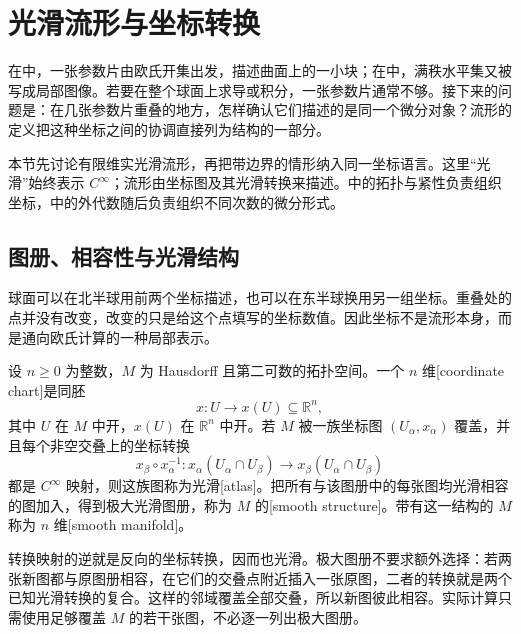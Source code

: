 \section{光滑流形与坐标转换}
\label{b1:sec:E101}

在中，一张参数片由欧氏开集出发，描述曲面上的一小块；在中，满秩水平集又被写成局部图像。若要在整个球面上求导或积分，一张参数片通常不够。接下来的问题是：在几张参数片重叠的地方，怎样确认它们描述的是同一个微分对象？流形的定义把这种坐标之间的协调直接列为结构的一部分。

\ProseParagraphBreak

本节先讨论有限维实光滑流形，再把带边界的情形纳入同一坐标语言。这里“光滑”始终表示 \(C^\infty\)；流形由坐标图及其光滑转换来描述。中的拓扑与紧性负责组织坐标，中的外代数随后负责组织不同次数的微分形式。

\subsection{图册、相容性与光滑结构}
\label{b1:subsec:E10101}

球面可以在北半球用前两个坐标描述，也可以在东半球换用另一组坐标。重叠处的点并没有改变，改变的只是给这个点填写的坐标数值。因此坐标不是流形本身，而是通向欧氏计算的一种局部表示。

\begin{definition}[光滑流形]\label{b1:def:E-smooth-manifold}
设 \(n\geq0\) 为整数，\(M\) 为 Hausdorff 且第二可数的拓扑空间。一个 \(n\) 维[coordinate chart]是同胚
\[
 x:U\longrightarrow x(U)\subseteq\mathbb R^n,
\]
其中 \(U\) 在 \(M\) 中开，\(x(U)\) 在 \(\mathbb R^n\) 中开。若 \(M\) 被一族坐标图 \((U_\alpha,x_\alpha)\) 覆盖，并且每个非空交叠上的坐标转换
\[
 x_\beta\circ x_\alpha^{-1}:
 x_\alpha(U_\alpha\cap U_\beta)
 \longrightarrow x_\beta(U_\alpha\cap U_\beta)
\]
都是 \(C^\infty\) 映射，则这族图称为光滑[atlas]。把所有与该图册中的每张图均光滑相容的图加入，得到极大光滑图册，称为 \(M\) 的[smooth structure]。带有这一结构的 \(M\) 称为 \(n\) 维[smooth manifold]。
\end{definition}

转换映射的逆就是反向的坐标转换，因而也光滑。极大图册不要求额外选择：若两张新图都与原图册相容，在它们的交叠点附近插入一张原图，二者的转换就是两个已知光滑转换的复合。这样的邻域覆盖全部交叠，所以新图彼此相容。实际计算只需使用足够覆盖 \(M\) 的若干张图，不必逐一列出极大图册。


